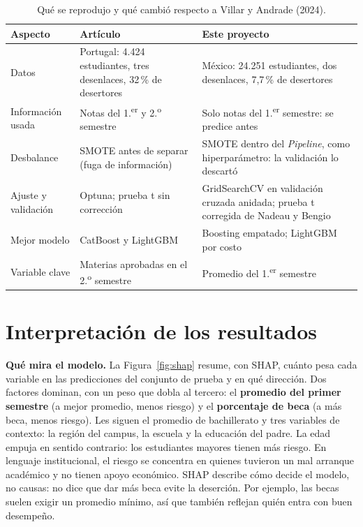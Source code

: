 \documentclass[11pt,a4paper]{article}
\begin{document}
\begin{table}[H]
\centering
\small
\caption{Qué se reprodujo y qué cambió respecto a Villar y Andrade (2024).}
\label{tab:articulo}
\begin{tabular}{>{\raggedright\arraybackslash}p{2.8cm}>{\raggedright\arraybackslash}p{5.5cm}>{\raggedright\arraybackslash}p{6.2cm}}
\toprule
Aspecto & Artículo & Este proyecto \\
\midrule
Datos & Portugal: 4.424 estudiantes, tres desenlaces, 32\,\% de desertores & México: 24.251 estudiantes, dos desenlaces, 7,7\,\% de desertores \\
Información usada & Notas del 1.\textsuperscript{er} y 2.\textsuperscript{o} semestre & Solo notas del 1.\textsuperscript{er} semestre: se predice antes \\
Desbalance & SMOTE antes de separar (fuga de información) & SMOTE dentro del \textit{Pipeline}, como hiperparámetro: la validación lo descartó \\
Ajuste y validación & Optuna; prueba t sin corrección & GridSearchCV en validación cruzada anidada; prueba t corregida de Nadeau y Bengio \\
Mejor modelo & CatBoost y LightGBM & Boosting empatado; LightGBM por costo \\
Variable clave & Materias aprobadas en el 2.\textsuperscript{o} semestre & Promedio del 1.\textsuperscript{er} semestre \\
\bottomrule
\end{tabular}
\end{table}

\section{Interpretación de los resultados}

\textbf{Qué mira el modelo.} La Figura~\ref{fig:shap} resume, con SHAP, cuánto pesa cada variable en las predicciones del conjunto de prueba y en qué dirección. Dos factores dominan, con un peso que dobla al tercero: el \textbf{promedio del primer semestre} (a mejor promedio, menos riesgo) y el \textbf{porcentaje de beca} (a más beca, menos riesgo). Les siguen el promedio de bachillerato y tres variables de contexto: la región del campus, la escuela y la educación del padre. La edad empuja en sentido contrario: los estudiantes mayores tienen más riesgo. En lenguaje institucional, el riesgo se concentra en quienes tuvieron un mal arranque académico y no tienen apoyo económico. SHAP describe cómo decide el modelo, no causas: no dice que dar más beca evite la deserción. Por ejemplo, las becas suelen exigir un promedio mínimo, así que también reflejan quién entra con buen desempeño.
\end{document}
